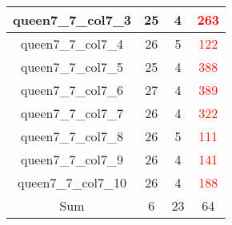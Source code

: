 \begin{longtable}{|c|c|c|c|}
  queen7\_7\_col7\_3 & 25 & 4 & \textcolor{red}{263} \\ \hline
  queen7\_7\_col7\_4 & 26 & 5 & \textcolor{red}{122} \\ \hline
  queen7\_7\_col7\_5 & 25 & 4 & \textcolor{red}{388} \\ \hline
  queen7\_7\_col7\_6 & 27 & 4 & \textcolor{red}{389} \\ \hline
  queen7\_7\_col7\_7 & 26 & 4 & \textcolor{red}{322} \\ \hline
  queen7\_7\_col7\_8 & 26 & 5 & \textcolor{red}{111} \\ \hline
  queen7\_7\_col7\_9 & 26 & 4 & \textcolor{red}{141} \\ \hline
  queen7\_7\_col7\_10 & 26 & 4 & \textcolor{red}{188} \\ \hline \hline
  Sum & 6 & 23 & 64 \\ \hline
\end{longtable}